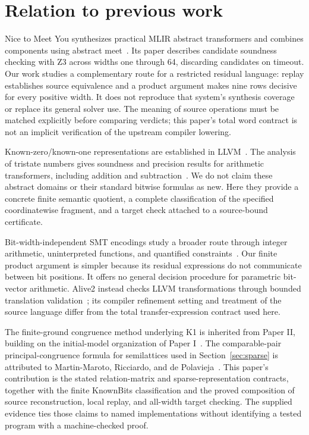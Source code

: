 \section{Relation to previous work}

Nice to Meet You synthesizes practical MLIR abstract transformers and combines components using abstract meet~\cite{Peng2026,NTMYArtifact}. Its paper describes candidate soundness checking with Z3 across widths one through 64, discarding candidates on timeout. Our work studies a complementary route for a restricted residual language: replay establishes source equivalence and a product argument makes nine rows decisive for every positive width. It does not reproduce that system's synthesis coverage or replace its general solver use. The meaning of source operations must be matched explicitly before comparing verdicts; this paper's total word contract is not an implicit verification of the upstream compiler lowering.

Known-zero/known-one representations are established in LLVM~\cite{LLVMKnownBits}. The analysis of tristate numbers gives soundness and precision results for arithmetic transformers, including addition and subtraction~\cite{Vishwanathan2022}. We do not claim these abstract domains or their standard bitwise formulas as new. Here they provide a concrete finite semantic quotient, a complete classification of the specified coordinatewise fragment, and a target check attached to a source-bound certificate.

Bit-width-independent SMT encodings study a broader route through integer arithmetic, uninterpreted functions, and quantified constraints~\cite{Niemetz2019}. Our finite product argument is simpler because its residual expressions do not communicate between bit positions. It offers no general decision procedure for parametric bit-vector arithmetic. Alive2 instead checks LLVM transformations through bounded translation validation~\cite{Lopes2021}; its compiler refinement setting and treatment of the source language differ from the total transfer-expression contract used here.

The finite-ground congruence method underlying K1 is inherited from Paper II, building on the initial-model organization of Paper I~\cite{ShcherbakovI,ShcherbakovII}. The comparable-pair principal-congruence formula for semilattices used in Section~\ref{sec:sparse} is attributed to Martin-Maroto, Ricciardo, and de Polavieja~\cite{MartinMaroto2026}. This paper's contribution is the stated relation-matrix and sparse-representation contracts, together with the finite KnownBits classification and the proved composition of source reconstruction, local replay, and all-width target checking. The supplied evidence ties those claims to named implementations without identifying a tested program with a machine-checked proof.
